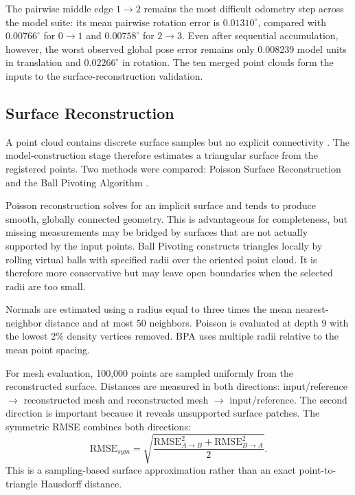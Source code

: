 The pairwise middle edge $1\rightarrow2$ remains the most difficult odometry step across the model suite: its mean pairwise rotation error is $0.01310^\circ$, compared with $0.00766^\circ$ for $0\rightarrow1$ and $0.00758^\circ$ for $2\rightarrow3$. Even after sequential accumulation, however, the worst observed global pose error remains only 0.008239 model units in translation and $0.02266^\circ$ in rotation. The ten merged point clouds form the inputs to the surface-reconstruction validation.

\subsection{Surface Reconstruction}
\label{sec:marvin-surface-reconstruction}

A point cloud contains discrete surface samples but no explicit connectivity \cite{kraus_huang2024}. The model-construction stage therefore estimates a triangular surface from the registered points. Two methods were compared: Poisson Surface Reconstruction \cite{kraus_kazhdan2006} and the Ball Pivoting Algorithm \cite{kraus_bernardini1999}.

Poisson reconstruction solves for an implicit surface and tends to produce smooth, globally connected geometry. This is advantageous for completeness, but missing measurements may be bridged by surfaces that are not actually supported by the input points. Ball Pivoting constructs triangles locally by rolling virtual balls with specified radii over the oriented point cloud. It is therefore more conservative but may leave open boundaries when the selected radii are too small.

Normals are estimated using a radius equal to three times the mean nearest-neighbor distance and at most 50 neighbors. Poisson is evaluated at depth 9 with the lowest 2\% density vertices removed. BPA uses multiple radii relative to the mean point spacing.

For mesh evaluation, 100,000 points are sampled uniformly from the reconstructed surface. Distances are measured in both directions: input/reference $\rightarrow$ reconstructed mesh and reconstructed mesh $\rightarrow$ input/reference. The second direction is important because it reveals unsupported surface patches. The symmetric RMSE combines both directions:
\begin{equation}
    \mathrm{RMSE}_{sym} =
    \sqrt{\frac{\mathrm{RMSE}_{A\rightarrow B}^{2}+
    \mathrm{RMSE}_{B\rightarrow A}^{2}}{2}}.
\end{equation}
This is a sampling-based surface approximation rather than an exact point-to-triangle Hausdorff distance.

